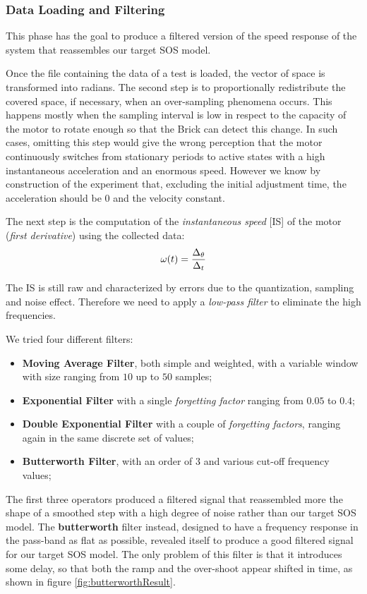 \subsubsection{Data Loading and Filtering}

This phase has the goal to produce a filtered version of the speed response of the system that reassembles our target SOS model.

Once the file containing the data of a test is loaded, the vector of space is transformed into radians. The second step is to proportionally redistribute the covered space, if necessary, when an over-sampling phenomena occurs. This happens mostly when the sampling interval is low in respect to the capacity of the motor to rotate enough so that the Brick can detect this change. In such cases, omitting this step would give the wrong perception that the motor continuously switches from stationary periods to active states with a high instantaneous acceleration and an enormous speed. However we know by construction of the experiment that, excluding the initial adjustment time, the acceleration should be $0$ and the velocity constant.

The next step is the computation of the \textit{instantaneous speed} [IS] of the motor (\emph{first derivative}) using the collected data:
\[
  \omega(t) = {\Delta_\theta \over \Delta_t}
\]

The IS is still raw and characterized by errors due to the quantization, sampling and noise effect. Therefore we need to apply a \textit{low-pass filter} to eliminate the high frequencies.

We tried four different filters:
\begin{itemize}
\item \textbf{Moving Average Filter}, both simple and weighted, with a variable window with size ranging from $10$ up to $50$ samples;
\item \textbf{Exponential Filter} with a single \textit{forgetting factor} ranging from $0.05$ to $0.4$;
\item \textbf{Double Exponential Filter} with a couple of \textit{forgetting factors}, ranging again in the same discrete set of values;
\item \textbf{Butterworth Filter}, with an order of $3$ and various cut-off frequency values;
\end{itemize}

The first three operators produced a filtered signal that reassembled more the shape of a smoothed step with a high degree of noise rather than our target SOS model. The \textbf{butterworth} filter instead, designed to have a frequency response in the pass-band as flat as possible, revealed itself to produce a good filtered signal for our target SOS model. The only problem of this filter is that it introduces some delay, so that both the ramp and the over-shoot appear shifted in time, as shown in figure \ref{fig:butterworthResult}.

